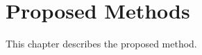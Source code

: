 \chapter{Proposed Methods}
\label{chapter:method}

\begin{ChapAbstract}
    This chapter describes the proposed method.
\end{ChapAbstract}



